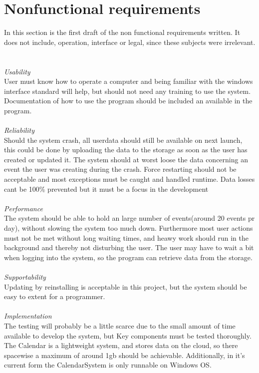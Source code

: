 \section{Nonfunctional requirements}

In this section is the first draft of the non functional requirements written. It does not include, operation, interface or legal, since these subjects were irrelevant.
\\ 
\\
\HRule \\[0.4cm]
\emph{Usability} \\ 
User must know how to operate a computer and being familiar with the windows interface standard will help, but should not need any training to use the system. Documentation of how to use the program should be included an available in the program. \\
\HRule \\[0.4cm]
\emph{Reliability} \\
Should the system crash, all userdata should still be available on next launch, this could be done by uploading the data to the storage as soon as the user has created or updated it. The system should at worst loose the data concerning an event the user was creating during the crash. Force restarting should not be acceptable and most exceptions must be caught and handled runtime. Data losses cant be 100\% prevented but it must be a focus in the development\\
\HRule \\[0.4cm]
\emph{Performance} \\
The system should be able to hold an large number of events(around 20 events pr day), without slowing the system too much down. Furthermore most user actions must not be met without long waiting times, and heawy work should run in the background and thereby not disturbing the user. The user may have to wait a bit when logging into the system, so the program can retrieve data from the storage.\\
\HRule \\[0.4cm]
\emph{Supportability} \\
Updating by reinstalling is acceptable in this project, but the system should be easy to extent for a programmer.\\
\HRule \\[0.4cm]
\emph{Implementation}\\
The testing will probably be a little scarce due to the small amount of time available to develop the system, but Key components must be tested thoroughly.  The Calendar is a lightweight system, and stores data on the cloud, so there spacewise a maximum of around 1gb should be achievable. Additionally, in it's current form the CalendarSystem is only runnable on Windows OS.\\
\HRule \\[0.4cm]

\newpage